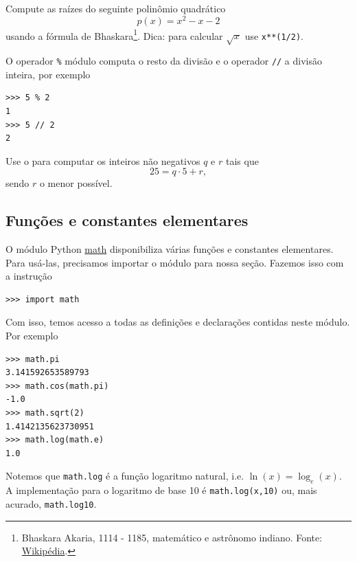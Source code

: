 \documentclass[12pt]{article}
\begin{document}
\begin{exr}\label{exr:bhaskara}
  Compute as raízes do seguinte polinômio quadrático
  \begin{equation}
    p(x) = x^2 - x - 2
  \end{equation}
  usando a fórmula de Bhaskara\footnote{Bhaskara Akaria, 1114 - 1185, matemático e astrônomo indiano. Fonte: \href{https://pt.wikipedia.org/wiki/Bhaskara\_II}{Wikipédia}.}. Dica: para calcular $\sqrt{x}$ use \lstinline+x**(1/2)+.
\end{exr}

O operador \lstinline+%+%
módulo computa o resto da divisão e o operador \lstinline+//+ a divisão inteira, por exemplo
\begin{lstlisting}
>>> 5 % 2
1
>>> 5 // 2
2
\end{lstlisting}

\begin{exr}
  Use o {\python} para computar os inteiros não negativos $q$ e $r$ tais que
  \begin{equation}
    25 = q\cdot 5 + r,
  \end{equation}
  sendo $r$ o menor possível.
\end{exr}

\subsection{Funções e constantes elementares}

O módulo Python \href{https://docs.python.org/3/library/math.html}{math} disponibiliza várias funções e constantes elementares. Para usá-las, precisamos importar o módulo para nossa seção. Fazemos isso com a instrução
\begin{lstlisting}
>>> import math
\end{lstlisting}
Com isso, temos acesso a todas as definições e declarações contidas neste módulo. Por exemplo
\begin{lstlisting}
>>> math.pi
3.141592653589793
>>> math.cos(math.pi)
-1.0
>>> math.sqrt(2)
1.4142135623730951
>>> math.log(math.e)
1.0
\end{lstlisting}

\begin{obs}
  Notemos que \lstinline+math.log+ é a função logaritmo natural, i.e. $\ln(x) = \log_e(x)$. A implementação {\python} para o logaritmo de base 10 é \lstinline+math.log(x,10)+ ou, mais acurado, \lstinline+math.log10+.
\end{obs}
\end{document}
